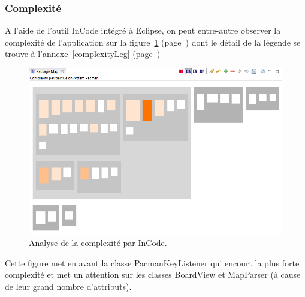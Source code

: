 \documentclass[12pt,a4paper,final]{article}
\newcommand{\annexe}[1]{annexe~\ref{#1} (page~\pageref{#1})}
\newcommand{\labelfigure}[1]{figure~\ref{#1} (page~\pageref{#1})}
\begin{document}
\subsubsection{Complexité}
A l'aide de l'outil InCode intégré à Eclipse, on peut entre-autre observer la complexité de l'application sur la \labelfigure{complexity} dont le détail de la légende se trouve à l'\annexe{complexityLeg}
\begin{figure}[!h]
	\centering
	\includegraphics[width=\textwidth]{InCodeComplexity.png}
	\caption{\label{complexity}Analyse de la complexité par InCode.}
\end{figure}
Cette figure met en avant la classe PacmanKeyListener qui encourt la plus forte complexité et met un attention sur les classes BoardView et MapParser (à cause de leur grand nombre d'attributs).
\end{document}
